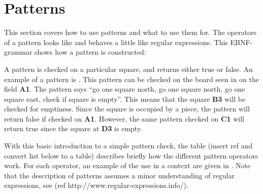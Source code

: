 \section{Patterns}
\label{sec:patterns}

This section covers how to use patterns and what to use them for. The operators of a pattern looks like and behaves a little like regular expressions. This EBNF-grammar shows how a pattern is constructed:

\begin{ebnf}
\end{ebnf}


A pattern is checked on a particular square, and returns either true or false. An example of a pattern is . This pattern can be checked on the board seen in  on the field \textbf{A1}. The pattern says ``go one square north, go one square north, go one square east, check if square is empty''. This means that the square \textbf{B3} will be checked for emptiness. Since the square is occupied by a piece, the pattern will return false if checked on \textbf{A1}. However, the same pattern checked on \textbf{C1} will return true since the square at \textbf{D3} is empty.

With this basic introduction to a simple pattern check, the table (insert ref and convert list below to a table) describes briefly how the different pattern operators work. For each operator, an example of the use in a context are given in . Note that the description of patterns assumes a minor understanding of regular expressions, see (ref http://www.regular-expressions.info/).

